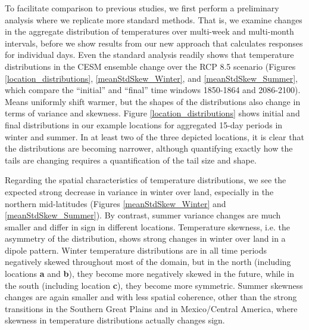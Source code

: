 \documentclass{ametsoc}
\begin{document}
To facilitate comparison to previous studies, we first perform a preliminary analysis where we replicate more standard methods. That is, we examine changes in the aggregate distribution of temperatures over multi-week and multi-month intervals, before we show results from our new approach that calculates responses for individual days. Even the standard analysis readily shows that temperature distributions in the CESM ensemble change over the RCP 8.5 scenario (Figures \ref{location_distributions}, \ref{meanStdSkew_Winter}, and \ref{meanStdSkew_Summer}, which compare the “initial” and “final” time windows 1850-1864 and 2086-2100). Means uniformly shift warmer, but the shapes of the distributions also change in terms of variance and skewness. Figure \ref{location_distributions} shows initial and final distributions in our example locations for aggregated 15-day periods in winter and summer. In at least two of the three depicted locations, it is clear that the distributions are becoming narrower, although quantifying exactly how the tails are changing requires a quantification of the tail size and shape.

Regarding the spatial characteristics of temperature distributions, we see the expected strong decrease in variance in winter over land, especially in the northern mid-latitudes (Figures \ref{meanStdSkew_Winter} and \ref{meanStdSkew_Summer}). By contrast, summer variance changes are much smaller and differ in sign in different locations. Temperature skewness, i.e. the asymmetry of the distribution, shows strong changes in winter over land in a dipole pattern. Winter temperature distributions are in all time periods negatively skewed throughout most of the domain, but in the north (including locations \textbf{a} and \textbf{b}), they become more negatively skewed in the future, while in the south (including location \textbf{c}), they become more symmetric.  Summer skewness changes are again smaller and with less spatial coherence, other than the strong transitions in the Southern Great Plains and in Mexico/Central America, where 
skewness in temperature distributions actually changes sign. 
 

\end{document}
